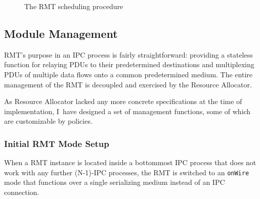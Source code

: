             \begin{figure}[H]
                \begin{center}
                  \caption{The RMT scheduling procedure}
                  \label{fig:sched-petri}
                \end{center}
            \end{figure}

        \subsection{Module Management}\label{implementation:mgmt}

            RMT's purpose in an IPC process is fairly straightforward: providing a stateless function for relaying PDUs to their predetermined destinations and multiplexing PDUs of multiple data flows onto a common predetermined medium. The entire management of the RMT is decoupled and exercised by the Resource Allocator.

            As Resource Allocator lacked any more concrete specifications at the time of implementation, I~have designed a set of management functions, some of which are customizable by policies.

            \subsubsection{Initial RMT Mode Setup}

                When a RMT instance is located inside a bottommost IPC process that does not work with any further (N-1)-IPC processes, the RMT is switched to an \texttt{onWire} mode that functions over a single serializing medium instead of an IPC connection.

